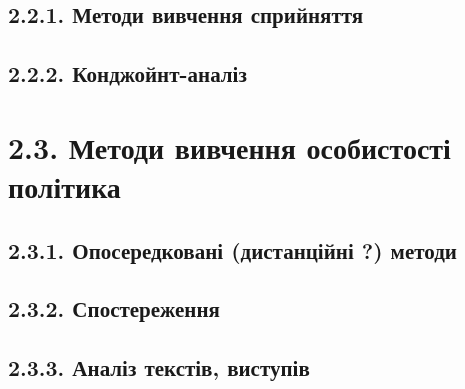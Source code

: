 \documentclass[
  10pt,
  a5paper,
  DIV=11,
  numbers=noendperiod]{scrreprt}
\begin{document}

\subsection*{2.2.1. Методи вивчення
сприйняття}\label{ux43cux435ux442ux43eux434ux438-ux432ux438ux432ux447ux435ux43dux43dux44f-ux441ux43fux440ux438ux439ux43dux44fux442ux442ux44f}

\subsection*{2.2.2.
Конджойнт-аналіз}\label{ux43aux43eux43dux434ux436ux43eux439ux43dux442-ux430ux43dux430ux43bux456ux437}

\section*{2.3. Методи вивчення особистості
політика}\label{ux43cux435ux442ux43eux434ux438-ux432ux438ux432ux447ux435ux43dux43dux44f-ux43eux441ux43eux431ux438ux441ux442ux43eux441ux442ux456-ux43fux43eux43bux456ux442ux438ux43aux430}


\subsection*{2.3.1. Опосередковані (дистанційні ?)
методи}\label{ux43eux43fux43eux441ux435ux440ux435ux434ux43aux43eux432ux430ux43dux456-ux434ux438ux441ux442ux430ux43dux446ux456ux439ux43dux456-ux43cux435ux442ux43eux434ux438}

\subsection*{2.3.2.
Спостереження}\label{ux441ux43fux43eux441ux442ux435ux440ux435ux436ux435ux43dux43dux44f}

\subsection*{2.3.3. Аналіз текстів,
виступів}\label{ux430ux43dux430ux43bux456ux437-ux442ux435ux43aux441ux442ux456ux432-ux432ux438ux441ux442ux443ux43fux456ux432}
\end{document}
